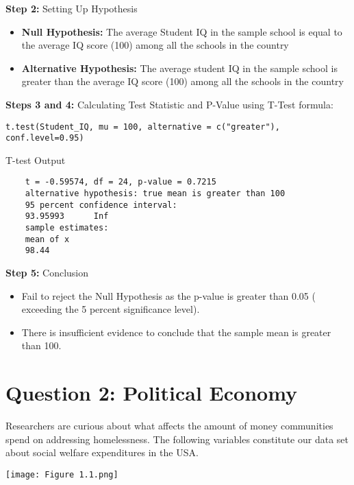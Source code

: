 \documentclass[12pt,letterpaper]{article}
\begin{document}
\vspace{.5cm}
\textbf{Step 2: }Setting Up Hypothesis
\begin{itemize}
\item
\textbf{Null Hypothesis:} The average Student IQ in the sample school is equal to the average IQ score (100) among all the schools in the country 
\item
\textbf{Alternative Hypothesis:} The average student IQ in the sample school is greater than the average IQ score (100) among all the schools in the country
\end{itemize}
\vspace{.5cm}
\textbf{Steps 3 and 4:} Calculating Test Statistic and P-Value using T-Test formula: 
\begin{verbatim}
t.test(Student_IQ, mu = 100, alternative = c("greater"), conf.level=0.95)
\end{verbatim}

T-test Output
\begin{verbatim}
	t = -0.59574, df = 24, p-value = 0.7215
	alternative hypothesis: true mean is greater than 100
	95 percent confidence interval:
	93.95993      Inf
	sample estimates:
	mean of x 
	98.44 
\end{verbatim}
\vspace{.5cm}
\textbf{Step 5:} Conclusion  
\begin{itemize}
	\item 
Fail to reject the Null Hypothesis as the p-value is greater than 0.05 ( exceeding the 5 percent significance level). 
\item 
There is insufficient evidence to conclude that the sample mean is greater than 100.
\end{itemize}

\newpage

	\section*{Question 2: Political Economy}

\noindent Researchers are curious about what affects the amount of money communities spend on addressing homelessness. The following variables constitute our data set about social welfare expenditures in the USA. \\
\vspace{.5cm}

\texttt{[image: Figure 1.1.png]}
\end{document}
